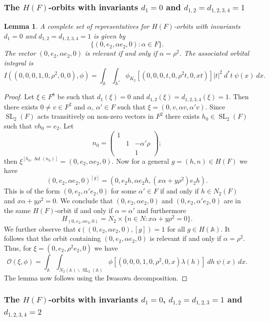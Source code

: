 \documentclass[12pt]{amsart}
\newcommand{\abs}[1]{\left|{#1}\right|}
\newcommand{\SL}{\operatorname{SL}}
\newcommand{\Ad}{\operatorname{Ad}}
\newcommand{\A}{\mathbb{A}}
\newcommand{\bs}{\backslash}
\renewcommand{\O}{\mathcal{O}}
\renewcommand{\c}{\mathfrak{c}}
\newtheorem{lemma}[theorem]{Lemma}
\theoremstyle{remark}
\begin{document}
\subsubsection{The $H(F)$-orbits with invariants $d_1=0$ and $d_{1,2}=d_{1,2,3,4}=1$}
\begin{lemma}\label{lem sl2}
A complete set of representatives for $H(F)$-orbits with invariants $d_1=0$ and $d_{1,2}=d_{1,2,3,4}=1$ is given by 
\[
\{(0,e_2,\alpha e_2,0):\alpha\in F\}.
\]
The vector $(0,e_2,\alpha e_2,0)$ is relevant if and only if $\alpha=\rho^2$.
The associated orbital integral is
\[
I((0,0,0,1,0,\rho^2,0,0),\phi)=\int_\A\int_{\A^*} \phi_{K_2}[(0,0,0,t,0,\rho^2t,0,xt)]\abs{t}^2\ d^*t\ \psi(x) \ dx.
\]
\end{lemma}
\begin{proof}
Let $\xi\in F^8$ be such that $d_1(\xi)=0$ and $d_{1,2}(\xi)=d_{1,2,3,4}(\xi)=1$. Then there exists $0\ne v\in F^2$ and $\alpha,\,\alpha'\in F$ such that $\xi=(0,v,\alpha v,\alpha' v)$. Since $\SL_2(F)$ acts transitively on non-zero vectors in $F^2$ there exists $h_0\in \SL_2(F)$ such that $vh_0=e_2$. Let 
\[
n_0=\begin{pmatrix}
1 &  & \\ & 1 & -\alpha' \rho \\ & & 1
\end{pmatrix};
\] 
then $\xi^{[h_0,\Ad(n_0)]}=(0,e_2,\alpha e_2,0)$.
Now for a general $g=(h,n)\in H(F)$ we have
\[
(0,e_2,\alpha e_2,0)^{[g]}=(0,e_2 h,\alpha e_2 h,(x\alpha+y\rho^2)e_2 h).
\]
This is of the form $(0,e_2,\alpha'e_2,0)$ for some $\alpha'\in F$ if and only if $h\in N_2(F)$ and $x\alpha+y\rho^2=0$. We conclude that $(0,e_2,\alpha e_2,0)$ and $(0,e_2,\alpha'e_2,0)$ are in the same $H(F)$-orbit if and only if $\alpha=\alpha'$ and furthermore 
\[
H_{(0,e_2,\alpha e_2,0)}=N_2 \times \{n\in N: x\alpha+y\rho^2=0\}.
\] 
We further observe that $\c((0,e_2,\alpha e_2,0),[g])=1$ for all $g\in H(\A)$. It follows that the orbit containing $(0,e_2,\alpha e_2,0)$ is relevant if and only if $\alpha=\rho^2$. 
Thus, for $\xi=(0,e_2,\rho^2 e_2,0)$ we have
\[
\O(\xi,\phi)=\int_\A \int_{N_2(\A)\bs \SL_2(\A)} \phi[(0,0,0,1,0,\rho^2,0,x)\lambda(h)]\ dh\ \psi(x) \ dx.
\]
The lemma now follows using the Iwasawa decomposition.
\end{proof}
\subsubsection{The $H(F)$-orbits with invariants $d_1=0$, $d_{1,2}=d_{1,2,3}=1$ and $d_{1,2,3,4}=2$}
\end{document}
